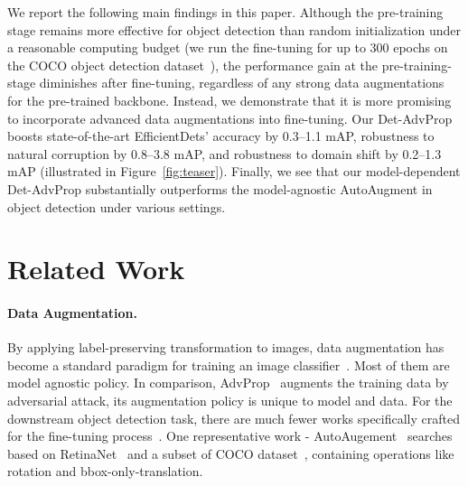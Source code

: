 \documentclass[final]{cvpr}
\begin{document}
We report the following main findings in this paper. 
Although the pre-training stage remains more effective for object detection than random initialization under a reasonable computing budget (we run the fine-tuning for up to 300 epochs on the COCO object detection dataset~\cite{lin2015coco}),
the performance gain at the pre-training-stage diminishes after fine-tuning, regardless of any strong data augmentations for the pre-trained backbone. Instead, we demonstrate that it is more promising to incorporate advanced data augmentations into fine-tuning. Our Det-AdvProp boosts state-of-the-art EfficientDets' accuracy by 0.3--1.1 mAP, robustness to natural corruption by 0.8--3.8 mAP, and robustness to domain shift by 0.2--1.3 mAP (illustrated in Figure~\ref{fig:teaser}). 
Finally, we see that our model-dependent Det-AdvProp substantially outperforms the model-agnostic AutoAugment in object detection under various settings.










\section{Related Work}

\paragraph{Data Augmentation.}
By applying label-preserving transformation to images, data augmentation has become a standard paradigm for training an image classifier~\cite{cubuk2019autoaug, cubuk2020randaug, xie2020advprop, zhang2018mixup, lemley2017smart, lim2019fast, zhang2020adversarial, li2020shapetexture}.
Most of them are model agnostic policy.
In comparison, AdvProp~\cite{xie2020advprop} augments the training data by adversarial attack, its augmentation policy is unique to model and data.
For the downstream object detection task, there are much fewer works specifically crafted for the fine-tuning process~\cite{zhang2019bag, zoph2019learning}.
One representative work - AutoAugement~\cite{zoph2019learning} searches based on RetinaNet~\cite{lin2017focal} and a subset of COCO dataset~\cite{lin2015coco}, containing operations like rotation and bbox-only-translation.







\vspace{-10pt}
\end{document}
